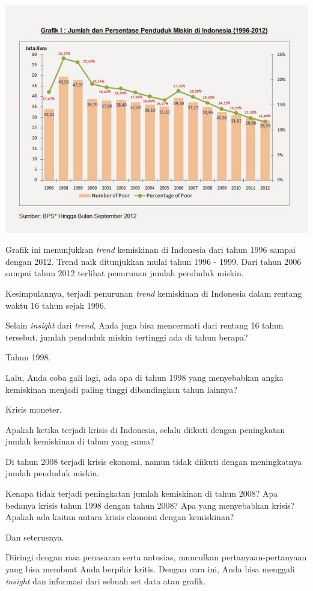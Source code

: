 \documentclass[openany]{book}
\begin{document}
\includegraphics[width=1\linewidth]{images/garis-kemiskinan}

Grafik ini menunjukkan \emph{trend} kemiskinan di Indonesia dari tahun
1996 sampai dengan 2012. Trend naik ditunjukkan mulai tahun 1996 - 1999.
Dari tahun 2006 sampai tahun 2012 terlihat penurunan jumlah penduduk
miskin.

Kesimpulannya, terjadi penurunan \emph{trend} kemiskinan di Indonesia
dalam rentang waktu 16 tahun sejak 1996.

Selain \emph{insight} dari \emph{trend}, Anda juga bisa mencermati dari
rentang 16 tahun tersebut, jumlah penduduk miskin tertinggi ada di tahun
berapa?

Tahun 1998.

Lalu, Anda coba gali lagi, ada apa di tahun 1998 yang menyebabkan angka
kemiskinan menjadi paling tinggi dibandingkan tahun lainnya?

Krisis moneter.

Apakah ketika terjadi krisis di Indonesia, selalu diikuti dengan
peningkatan jumlah kemiskinan di tahun yang sama?

Di tahun 2008 terjadi krisis ekonomi, namun tidak diikuti dengan
meningkatnya jumlah penduduk miskin.

Kenapa tidak terjadi peningkatan jumlah kemiskinan di tahun 2008? Apa
bedanya krisis tahun 1998 dengan tahun 2008? Apa yang menyebabkan
krisis? Apakah ada kaitan antara krisis ekonomi dengan kemiskinan?

Dan seterusnya.

Diiringi dengan rasa penasaran serta antusias, munculkan
pertanyaan-pertanyaan yang bisa membuat Anda berpikir kritis. Dengan
cara ini, Anda bisa menggali \emph{insight} dan informasi dari sebuah
set data atau grafik.
\end{document}
